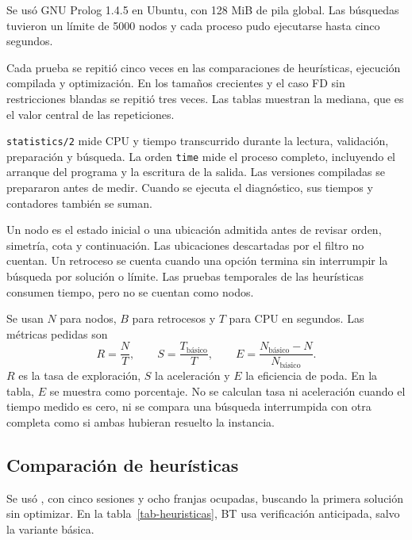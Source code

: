 \documentclass[11pt]{article}
\begin{document}
Se usó GNU Prolog 1.4.5 en Ubuntu, con 128 MiB de pila global. Las búsquedas tuvieron un límite de 5000 nodos y cada proceso pudo ejecutarse hasta cinco segundos.

Cada prueba se repitió cinco veces en las comparaciones de heurísticas, ejecución compilada y optimización. En los tamaños crecientes y el caso FD sin restricciones blandas se repitió tres veces. Las tablas muestran la mediana, que es el valor central de las repeticiones.

\texttt{statistics/2} mide CPU y tiempo transcurrido durante la lectura, validación, preparación y búsqueda. La orden \texttt{time} mide el proceso completo, incluyendo el arranque del programa y la escritura de la salida. Las versiones compiladas se prepararon antes de medir. Cuando se ejecuta el diagnóstico, sus tiempos y contadores también se suman.

Un nodo es el estado inicial o una ubicación admitida antes de revisar orden, simetría, cota y continuación. Las ubicaciones descartadas por el filtro no cuentan. Un retroceso se cuenta cuando una opción termina sin interrumpir la búsqueda por solución o límite. Las pruebas temporales de las heurísticas consumen tiempo, pero no se cuentan como nodos.

Se usan $N$ para nodos, $B$ para retrocesos y $T$ para CPU en segundos. Las métricas pedidas son
\[
    R=\frac{N}{T},\qquad
    S=\frac{T_{\text{básico}}}{T},\qquad
    E=\frac{N_{\text{básico}}-N}{N_{\text{básico}}}.
\]
$R$ es la tasa de exploración, $S$ la aceleración y $E$ la eficiencia de poda. En la tabla, $E$ se muestra como porcentaje. No se calculan tasa ni aceleración cuando el tiempo medido es cero, ni se compara una búsqueda interrumpida con otra completa como si ambas hubieran resuelto la instancia.

\subsection{Comparación de heurísticas}

Se usó , con cinco sesiones y ocho franjas ocupadas, buscando la primera solución sin optimizar. En la tabla~\ref{tab-heuristicas}, BT usa verificación anticipada, salvo la variante básica.
\end{document}
